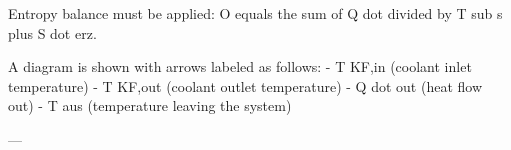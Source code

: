 Entropy balance must be applied:  
O equals the sum of Q dot divided by T sub s plus S dot erz.  

A diagram is shown with arrows labeled as follows:  
- T KF,in (coolant inlet temperature)  
- T KF,out (coolant outlet temperature)  
- Q dot out (heat flow out)  
- T aus (temperature leaving the system)  

---